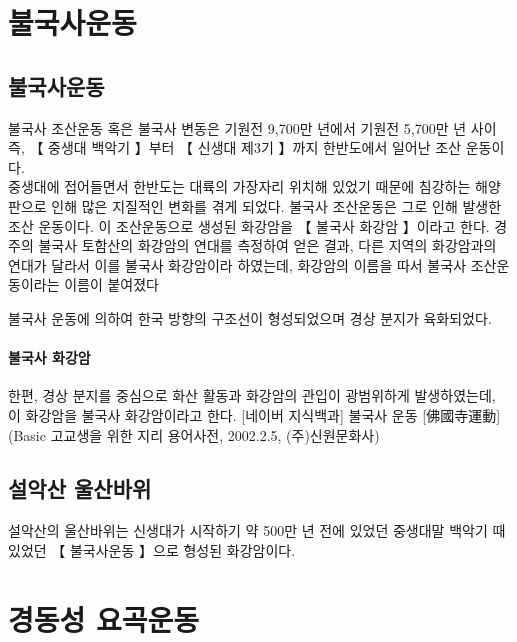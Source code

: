 \documentclass[12pt,a4paper]{book}
\newcommand{\SectionMargin}			{\newpage  \null \vskip 0cm}
\begin{document}
	\SectionMargin
	\section{불국사운동}




	\subsection{불국사운동}

		불국사 조산운동 혹은 불국사 변동은 기원전 9,700만 년에서 기원전 5,700만 년 사이 
		즉, 【 중생대 백악기 】부터 【 신생대 제3기 】까지 한반도에서 일어난 조산 운동이다.
		\\[-1.0em]

		중생대에 접어들면서 한반도는 대륙의 가장자리 위치해 있었기 때문에 
		침강하는 해양판으로 인해 많은 지질적인 변화를 겪게 되었다. 
		불국사 조산운동은 그로 인해 발생한 조산 운동이다. 
		이 조산운동으로 생성된 화강암을 【 불국사 화강암 】이라고 한다. 
		경주의 불국사 토함산의 화강암의 연대를 측정하여 얻은 결과, 
		다른 지역의 화강암과의 연대가 달라서 이를 불국사 화강암이라 하였는데, 화강암의 이름을 따서 불국사 조산운동이라는 이름이 붙여졌다

		불국사 운동에 의하여 한국 방향의 구조선이 형성되었으며 경상 분지가 육화되었다. 

		\paragraph{불국사 화강암}
		한편, 경상 분지를 중심으로 화산 활동과 화강암의 관입이 광범위하게 발생하였는데, 이 화강암을 불국사 화강암이라고 한다.
		[네이버 지식백과] 불국사 운동 [佛國寺運動] (Basic 고교생을 위한 지리 용어사전, 2002.2.5, (주)신원문화사)



	\subsection{설악산 울산바위}
	설악산의 울산바위는 신생대가 시작하기 약 500만 년 전에 있었던 중생대말 백악기 때 있었던 【 불국사운동 】으로 형성된 화강암이다.







	\SectionMargin
	\section{	경동성 요곡운동}
\end{document}
